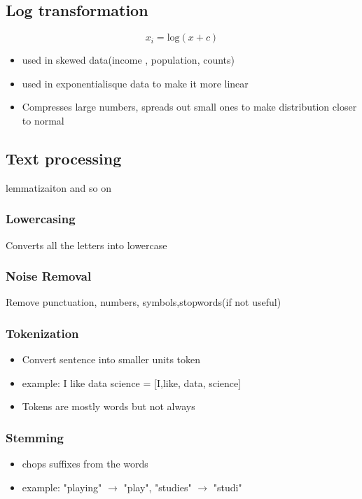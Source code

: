 \documentclass[12pt]{extarticle}
\begin{document}
\subsection{Log transformation}
$$ x_i = \text{log}(x+c) $$
\begin{itemize}
    \item used in skewed data(income , population, counts)
    \item used in exponentialisque data to make it more linear
    \item Compresses large numbers, spreads out small ones to make
        distribution closer to normal
\end{itemize}

\subsection{Text processing}
lemmatizaiton and so on

\subsubsection{Lowercasing}
Converts all the letters into lowercase

\subsubsection{Noise Removal}
Remove punctuation, numbers, symbols,stopwords(if not useful)

\subsubsection{Tokenization}
\begin{itemize}
    \item Convert sentence into smaller units token 
    \item example: I like data science = [I,like, data, science]
    \item Tokens are mostly words but not always
\end{itemize}
\subsubsection{Stemming}
\begin{itemize}
    \item chops suffixes from the words
    \item example: "playing" $\to$ "play", "studies" $\to$ "studi"
\end{itemize}
\end{document}
